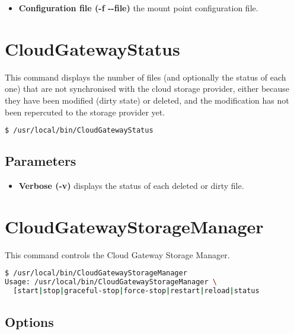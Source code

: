 \documentclass[11pt,fleqn,openany]{book} %
\begin{document}
\begin{itemize}
\item \textbf{Configuration file (-f -{}-file)} the mount point configuration file.

\end{itemize}

\clearpage

\section*{CloudGatewayStatus}
\label{sec:cloudgatewaystatus}

This command displays the number of files (and optionally the status of each one) that are not synchronised
with the cloud storage provider, either because they have been modified (dirty state) or deleted, and the
modification has not been repercuted to the storage provider yet.

\begin{lstlisting}[language=bash]
$ /usr/local/bin/CloudGatewayStatus
\end{lstlisting}

\subsection*{Parameters}

\begin{itemize}
\item \textbf{Verbose (-v)} displays the status of each deleted or dirty file.

\end{itemize}

\clearpage

\section*{CloudGatewayStorageManager}
\label{sec:cloudgatewaystoragemanager}

This command controls the Cloud Gateway Storage Manager.

\begin{lstlisting}[language=bash]
$ /usr/local/bin/CloudGatewayStorageManager
Usage: /usr/local/bin/CloudGatewayStorageManager \
  [start|stop|graceful-stop|force-stop|restart|reload|status
\end{lstlisting}

\subsection*{Options}
\end{document}
